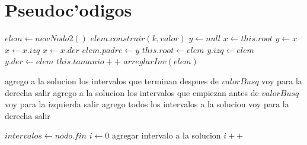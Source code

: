 \section{Pseudoc'odigos}
\begin{algorithmic}[1]
\STATE $elem \leftarrow new Nodo2()$
\STATE $elem.construir(k, valor)$
\STATE $y \leftarrow null$
\STATE $x \leftarrow this.root$
	\STATE $y \leftarrow x$
		\STATE $x \leftarrow x.izq$
	\ELSE
		\STATE $x \leftarrow x.der$
	\ENDIF
\ENDWHILE
\STATE $elem.padre \leftarrow y$
	\STATE $this.root \leftarrow elem$
	\STATE $y.izq \leftarrow elem$
\ELSE
	\STATE $y.der \leftarrow elem$
\ENDIF
\STATE $this.tamanio++$
\STATE $arreglarInv(elem)$
\end{algorithmic}

\vspace{2em}

\begin{algorithmic}[1]
		\STATE agrego a la solucion los intervalos que terminan despues de $valorBusq$
				\STATE voy para la derecha
		\ELSE
				\STATE salir
		\ENDIF
		\STATE agrego a la solucion los intervalos que empiezan antes de $valorBusq$
				\STATE voy para la izquierda
		\ELSE
				\STATE salir
		\ENDIF
	\ELSE
		\STATE agrego todos los intervalos a la solucion
				\STATE voy para la derecha
		\ELSE
				\STATE salir
		\ENDIF
	\ENDIF
\ENDWHILE
\end{algorithmic}

\vspace{2em}

\begin{algorithmic}[1]
\STATE $intervalos \leftarrow  nodo.fin$
\STATE $i \leftarrow 0$
	agregar intervalo a la solucion
 	$i++$
\ENDWHILE
\end{algorithmic}

\vspace{2em}

